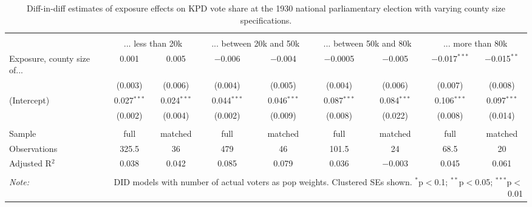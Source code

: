 
\begin{table}[!htbp] \centering 
  \caption{Diff-in-diff estimates of exposure effects on KPD vote share at the 1930 national parliamentary election with varying county size specifications.\vspace{-.25cm}} 
  \label{tab:nsdap-voteshare-kpd-countysize-dd-1930} 
\scriptsize 
\begin{tabular}{@{\extracolsep{5pt}}lcccccccc} 
\\[-1.8ex]\hline 
\hline \\[-1.8ex] 
 & \multicolumn{2}{c}{... less than 20k } & \multicolumn{2}{c}{... between 20k and 50k} & \multicolumn{2}{c}{... between 50k and 80k} & \multicolumn{2}{c}{... more than 80k} \\ 
 \cmidrule(r){2-3}\cmidrule(r){4-5}\cmidrule(r){6-7}\cmidrule(r){8-9}Exposure, county size of... & 0.001 & 0.005 & $-$0.006 & $-$0.004 & $-$0.0005 & $-$0.005 & $-$0.017$^{***}$ & $-$0.015$^{**}$ \\ 
  & (0.003) & (0.006) & (0.004) & (0.005) & (0.004) & (0.006) & (0.007) & (0.008) \\ 
  (Intercept) & 0.027$^{***}$ & 0.024$^{***}$ & 0.044$^{***}$ & 0.046$^{***}$ & 0.087$^{***}$ & 0.084$^{***}$ & 0.106$^{***}$ & 0.097$^{***}$ \\ 
  & (0.002) & (0.004) & (0.002) & (0.009) & (0.008) & (0.022) & (0.008) & (0.014) \\ 
 \hline \\[-1.8ex] 
Sample & full & matched & full & matched & full & matched & full & matched \\ 
Observations & 325.5 & 36 & 479 & 46 & 101.5 & 24 & 68.5 & 20 \\ 
Adjusted R$^{2}$ & 0.038 & 0.042 & 0.085 & 0.079 & 0.036 & $-$0.003 & 0.045 & 0.061 \\ 
\hline 
\hline \\[-1.8ex] 
\textit{Note:}  & \multicolumn{8}{r}{DID models with number of actual voters as pop weights. Clustered SEs shown. $^{*}$p$<$0.1; $^{**}$p$<$0.05; $^{***}$p$<$0.01} \\ 
\end{tabular} 
\end{table} 
